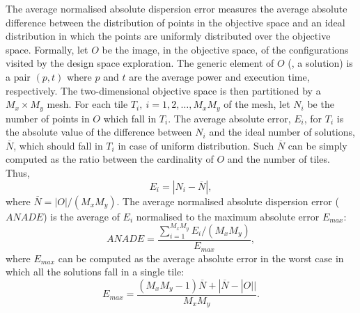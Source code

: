 \begin{table}
\end{table}
The average normalised absolute dispersion error measures
the average absolute difference between the distribution of points in
the objective space and an ideal distribution in which the points are
uniformly distributed over the objective space. Formally, let $O$ be
the image, in the objective space, of the configurations visited by
the design space exploration. The generic element of $O$ (\ie, a
solution) is a pair $(p,t)$ where $p$ and $t$ are the average power
and execution time, respectively. The two-dimensional objective space
is then partitioned by a $M_x \times M_y$ mesh. For each tile $T_i,
\ i=1, 2, \ldots, M_xM_y$ of the mesh, let $N_i$ be the number
of points in $O$ which fall in $T_i$. The average absolute error, $E_i$, for
$T_i$ is the absolute value of the difference between $N_i$ and the
ideal number of solutions, $\overline{N}$, which should fall in $T_i$
in case of uniform distribution. Such $\overline{N}$ can be simply
computed as the ratio between the cardinality of $O$ and the number of
tiles. Thus,
\[ E_i = |N_i - \overline{N}|, \]
where $\overline{N} = |O| / (M_x M_y)$. The average
normalised absolute dispersion error ($ANADE$) is the average of $E_i$
normalised to the maximum absolute error $E_{max}$:
\[ ANADE = \frac{\sum_{i=1}^{M_xM_y} E_i/(M_xM_y)}{E_{max}}, \]
where $E_{max}$ can be computed as the average absolute error in the worst
case in which all the solutions fall in a single tile:
\[ E_{max} = \frac{(M_x M_y - 1) \overline{N} + |\overline{N} -
    |O|| }{M_x M_y}. \] 

